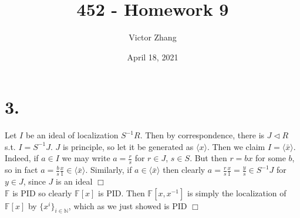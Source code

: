 \documentclass{article}
\title{452 - Homework 9}
\author{Victor Zhang}
\date{April 18, 2021}
\begin{document}
\maketitle

\section*{3.}
Let $I$ be an ideal of localization $S^{-1}R$. Then by correspondence, there is $J \lhd R$ s.t. $I = S^{-1}J$. $J$ is principle, so let it be generated as $\langle x \rangle$. Then we claim $I = \langle \bar{x} \rangle$. Indeed, if $a \in I$ we may write $a = \frac{r}{s}$ for $r \in J$, $s \in S$. But then $r = bx$ for some $b$, so in fact $a = \frac{b}{s}\frac{x}{1} \in \langle \bar{x} \rangle$. Similarly, if $a \in \langle \bar{x} \rangle$ then clearly $a = \frac{r}{s}\frac{x}{1} = \frac{y}{s} \in S^{-1}J$ for $y \in J$, since $J$ is an ideal $\Box$\\
$\mathbb{F}$ is PID so clearly $\mathbb{F}[x]$ is PID. Then $\mathbb{F}[x,x^{-1}]$ is simply the localization of $\mathbb{F}[x]$ by $\{x^i\}_{i \in \mathbb{N}}$, which as we just showed is PID $\Box$
\end{document}
